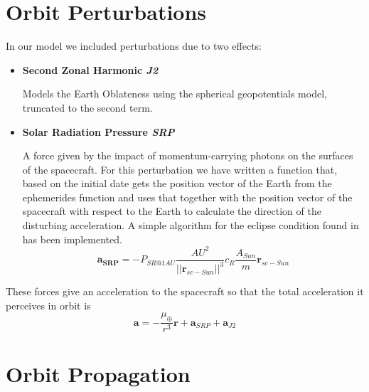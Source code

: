 \documentclass[11pt,a4paper]{report}
\renewcommand{\vec}[1]{\mathbf{#1}}
\begin{document}
\section{Orbit Perturbations}
In our model we included perturbations due to two effects:
\begin{itemize}
    \item \textbf{Second Zonal Harmonic \emph{J2}} \par Models the Earth Oblateness using the spherical geopotentials model, truncated to the second term.
    \item \textbf{Solar Radiation Pressure \emph{SRP}} \par A force given by the impact of momentum-carrying photons on the surfaces of the spacecraft. For this perturbation we have written a function that, based on the initial date gets the position vector of the Earth from the ephemerides function and uses that together with the position vector of the spacecraft with respect to the Earth to calculate the direction of the disturbing acceleration. A simple algorithm for the eclipse condition found in \cite{SRP_Curtis} has been implemented.
    \begin{equation}
        \vec{a_{SRP}} = -P_{SR@1AU}\frac{AU^2}{||\vec{r}_{sc-Sun}||^3}c_R\frac{A_{Sun}}{m}\vec{r}_{sc-Sun}
    \end{equation}
\end{itemize}

These forces give an acceleration to the spacecraft so that the total acceleration it perceives in orbit is
\begin{equation}
    \vec{a} = - \frac{\mu_{\oplus}}{r^3}\vec{r} + \vec{a}_{SRP} + \vec{a}_{J2}
\end{equation}

\section{Orbit Propagation}
\end{document}
